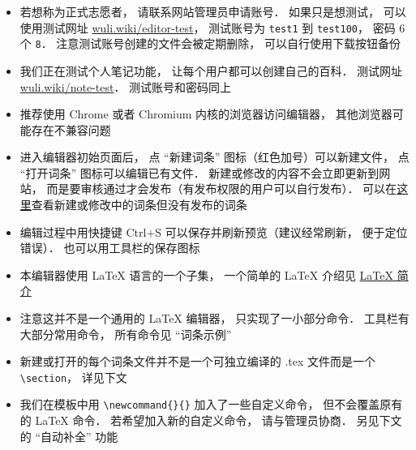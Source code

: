 \begin{itemize}
\item 若想称为正式志愿者， 请联系网站管理员申请账号． 如果只是想测试， 可以使用测试网址 \href{http://wuli.wiki/editor-test}{wuli.wiki/editor-test}， 测试账号为 \verb|test1| 到 \verb|test100|， 密码 6 个 \verb|8|． 注意测试账号创建的文件会被定期删除， 可以自行使用下载按钮备份
\item 我们正在测试个人笔记功能， 让每个用户都可以创建自己的百科． 测试网址 \href{http://wuli.wiki/note-test}{wuli.wiki/note-test}． 测试账号和密码同上
\item 推荐使用 Chrome 或者 Chromium 内核的浏览器访问编辑器， 其他浏览器可能存在不兼容问题
\item 进入编辑器初始页面后， 点 “新建词条” 图标（红色加号）可以新建文件， 点 “打开词条” 图标可以编辑已有文件． 新建或修改的内容不会立即更新到网站， 而是要审核通过才会发布（有发布权限的用户可以自行发布）． 可以在\href{http://wuli.wiki/changed/changed.html}{这里}查看新建或修改中的词条但没有发布的词条
\item 编辑过程中用快捷键 Ctrl+S 可以保存并刷新预览（建议经常刷新， 便于定位错误）． 也可以用工具栏的保存图标
\item 本编辑器使用 LaTeX 语言的一个子集， 一个简单的 LaTeX 介绍见 \href{http://wuli.wiki/online/latxIn.html}{LaTeX 简介}
\item 注意这并不是一个通用的 LaTeX 编辑器， 只实现了一小部分命令． 工具栏有大部分常用命令， 所有命令见 “词条示例”
\item 新建或打开的每个词条文件并不是一个可独立编译的 .tex 文件而是一个 \verb|\section|， 详见下文
\item 我们在模板中用 \verb|\newcommand{}{}| 加入了一些自定义命令， 但不会覆盖原有的 LaTeX 命令． 若希望加入新的自定义命令， 请与管理员协商． 另见下文的 “自动补全” 功能
\end{itemize}


